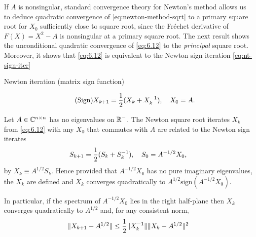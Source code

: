 \documentclass{article}
\newcommand{\sign}{\mathrm{sign}}
\begin{document}
If $A$ is nonsingular, standard convergence theory for Newton's method
allows us to deduce quadratic convergence of \eqref{eq:newton-method-sqrt}
to a primary square root for $X_0$ sufficiently close to square root, since
the Fr\'{e}chet derivative of $F(X) = X^2 - A$ is nonsingular at a primary
square root. The next result shows the unconditional quadratic convergence
of \eqref{eq:6.12} to the \emph{principal} square root. Moreover, it shows
that \eqref{eq:6.12} is equivalent to the Newton sign iteration
\eqref{eq:nt-sign-iter} 

\begin{mybox}{}
  \begin{center}
    \textsf{Newton iteration (matrix sign function)}
  \end{center}
  \begin{equation}
    \label{eq:nt-sign-iter}\tag{Sign}
    X_{k + 1} = \frac{1}{2}(X_k + X_k^{-1}), \quad X_0 = A.
  \end{equation}
\end{mybox}

\begin{theorem}
  \label{thm:6.9}
  Let $A\in\mathbb{C}^{n\times n}$ has no eigenvalues on $\mathbb{R}^-$. The Newton square root
  iterates $X_k$ from \eqref{eq:6.12} with any $X_0$ that commutes with $A$
  are related to the Newton sign iterates 
  \begin{equation}\notag
    S_{k + 1} = \frac{1}{2} (S_k + S_k^{-1}),\quad S_0 = A^{-1/2}X_0,
  \end{equation}
  by $X_k \equiv A^{1/2}S_k$. Hence provided that $A^{-1/2}X_0$ has no pure
  imaginary eigenvalues, the $X_k$ are defined and $X_k$ converges
  quadratically to $A^{1/2}\sign(A^{-1/2} X_0)$.

  In particular, if the spectrum of $A^{-1/2}X_0$ lies in the right
  half-plane then $X_k$ converges quadratically to $A^{1/2}$ and, for any
  consistent norm, 
  \begin{equation}\label{eq:6.13}
    \|{X_{k+1} - A^{1/2}}\| \leq \frac{1}{2} \|{X_k^{-1}}\| \|{X_k -
      A^{1/2}}\|^2 
  \end{equation}
\end{theorem}
\end{document}
